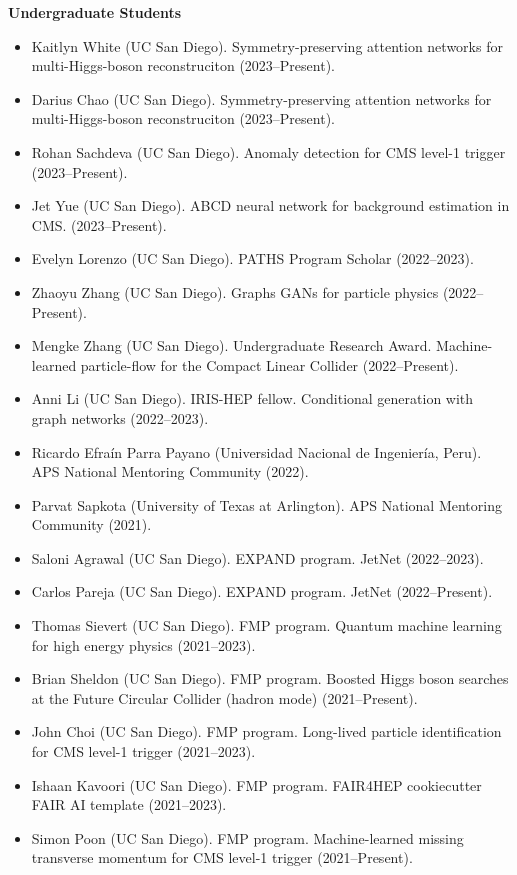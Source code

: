 \documentclass[11pt]{res}
\begin{document}
\begin{resume}
  \textbf{Undergraduate Students}
  \begin{itemize}
    \itemsep-0.3em
    \item Kaitlyn White (UC San Diego). Symmetry-preserving attention networks for multi-Higgs-boson reconstruciton (2023--Present).
    \item Darius Chao (UC San Diego). Symmetry-preserving attention networks for multi-Higgs-boson reconstruciton (2023--Present).
    \item Rohan Sachdeva (UC San Diego). Anomaly detection for CMS level-1 trigger (2023--Present).
    \item Jet Yue (UC San Diego). ABCD neural network for background estimation in CMS. ({2023--Present}).
    \item Evelyn Lorenzo (UC San Diego). PATHS Program Scholar (2022--2023).
    \item Zhaoyu Zhang (UC San Diego). Graphs GANs for particle physics ({2022--Present}).
    \item Mengke Zhang (UC San Diego). Undergraduate Research Award. Machine-learned particle-flow for the Compact Linear Collider ({2022--Present}).
    \item Anni Li (UC San Diego). IRIS-HEP fellow. Conditional generation with graph networks ({2022--2023}).
    \item Ricardo Efra\'{i}n Parra Payano (Universidad Nacional de Ingenier\'{i}a, Peru). APS National Mentoring Community ({2022}).
    \item Parvat Sapkota (University of Texas at Arlington). APS National Mentoring Community ({2021}).
    \item Saloni Agrawal (UC San Diego). EXPAND program. JetNet ({2022--2023}).
    \item Carlos Pareja (UC San Diego). EXPAND program. JetNet ({2022--Present}).
    \item Thomas Sievert (UC San Diego). FMP program. Quantum machine learning for high energy physics ({2021--2023}).
    \item Brian Sheldon (UC San Diego). FMP program. Boosted Higgs boson searches at the Future Circular Collider (hadron mode) ({2021--Present}).
    \item John Choi (UC San Diego). FMP program. Long-lived particle identification for CMS level-1 trigger ({2021--2023}).
    \item Ishaan Kavoori (UC San Diego). FMP program. FAIR4HEP cookiecutter FAIR AI template ({2021--2023}).
    \item Simon Poon (UC San Diego). FMP program. Machine-learned missing transverse momentum for CMS level-1 trigger ({2021--Present}).

\end{itemize}
\end{resume}
\end{document}
